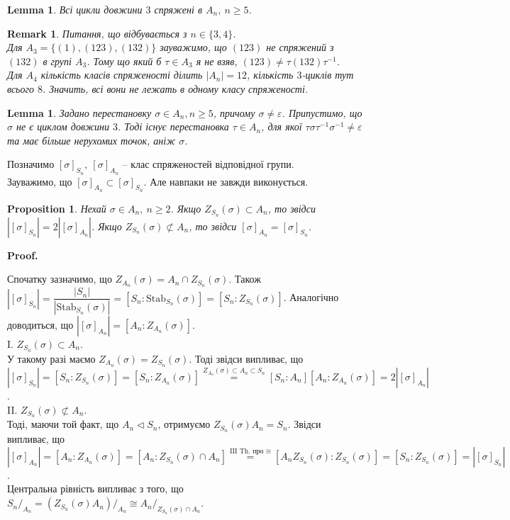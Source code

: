 \documentclass[a4paper, 10pt]{article}
\makeatletter
\theoremstyle{theoremdd}
\theoremstyle{theoremdd}
\theoremstyle{theoremdd}
\theoremstyle{theoremdd}
\theoremstyle{theoremdd}
\theoremstyle{theoremdd}
\theoremstyle{theoremdd}
\theoremstyle{theoremdd}
\theoremstyle{theoremdd}
\newtheorem{proposition}[theorem]{Proposition}
\theoremstyle{theoremdd}
\theoremstyle{theoremdd}
\newtheorem{remark}[theorem]{Remark}
\theoremstyle{theoremdd}
\theoremstyle{theoremdd}
\newtheorem{lemma}[theorem]{Lemma}
\theoremstyle{theoremdd}
\theoremstyle{theoremdd}
\renewenvironment{proof}[1][Proof.\\]{\par
\pushQED{\hfill \qed}%
\normalfont \topsep6\p@\@plus6\p@\relax
\trivlist
\item\relax
{\bfseries
#1\@addpunct{.}}\hspace\labelsep\ignorespaces
}{%
\popQED\endtrivlist\@endpefalse
}
\newcommand\Stab{\text{Stab}}
\makeatother
\begin{document}
\begin{lemma}
Всі цикли довжини $3$ спряжені в $A_n,\ n \geq 5$.
\end{lemma}

\begin{remark}
Питання, що відбувається з $n \in \{3,4\}$.\\
Для $A_3 = \{ (1), (123), (132) \}$ зауважимо, що $(123)$ не спряжений з $(132)$ в групі $A_3$. Тому що який б $\tau \in A_3$ я не взяв, $(123) \neq \tau (132) \tau^{-1}$.\\
Для $A_4$ кількість класів спряженості ділить $|A_n| = 12$, кількість $3$-циклів тут всього $8$. Значить, всі вони не лежать в одному класу спряженості.
\end{remark}

\begin{lemma}
Задано перестановку $\sigma \in A_n, n \geq 5$, причому $\sigma \neq \varepsilon$. Припустимо, що $\sigma$ не є циклом довжини $3$. Тоді існує перестановка $\tau \in A_n$, для якої $\tau \sigma \tau^{-1} \sigma^{-1} \neq \varepsilon$ та має більше нерухомих точок, аніж $\sigma$.
\end{lemma}

Позначимо $[\sigma]_{S_n},\ [\sigma]_{A_n}$ -- клас спряженостей відповідної групи.\\
Зауважимо, що $[\sigma]_{A_n} \subset [\sigma]_{S_n}$. Але навпаки не завжди виконується. 

\begin{proposition}
Нехай $\sigma \in A_n,\ n \geq 2$. Якщо $Z_{S_n}(\sigma) \subset A_n$, то звідси $|[\sigma]_{S_n}| = 2|[\sigma]_{A_n}|$. Якщо $Z_{S_n}(\sigma) \not\subset A_n$, то звідси $[\sigma]_{A_n} = [\sigma]_{S_n}$.
\end{proposition}

\begin{proof}
Спочатку зазначимо, що $Z_{A_n}(\sigma) = A_n \cap Z_{S_n}(\sigma)$. Також $|[\sigma]_{S_n}| = \dfrac{|S_n|}{|\Stab_{S_n}(\sigma)|} = [S_n : \Stab_{S_n}(\sigma)] = [S_n : Z_{S_n}(\sigma)]$. Аналогічно доводиться, що $|[\sigma]_{A_n}| = [A_n : Z_{A_n}(\sigma)]$.
\bigskip \\
I. $Z_{S_n}(\sigma) \subset A_n$.\\
У такому разі маємо $Z_{A_n}(\sigma) = Z_{S_n}(\sigma)$. Тоді звідси випливає, що\\
$|[\sigma]_{S_n}| = [S_n : Z_{S_n}(\sigma)] = [S_n : Z_{A_n}(\sigma)] \overset{Z_{A_n}(\sigma) \subset A_n \subset S_n}{=} [S_n : A_n] [A_n : Z_{A_n}(\sigma)] = 2 |[\sigma]_{A_n}|$.
\bigskip \\
II. $Z_{S_n}(\sigma) \not\subset A_n$.\\
Тоді, маючи той факт, що $A_n \triangleleft S_n$, отримуємо $Z_{S_n}(\sigma) A_n = S_n$. Звідси випливає, що\\
$|[\sigma]_{A_n}| = [A_n : Z_{A_n}(\sigma)] = [A_n : Z_{S_n}(\sigma) \cap A_n] \overset{\text{III Th. про $\cong$}}{=} [A_n Z_{S_n}(\sigma) : Z_{S_n}(\sigma)] = [S_n : Z_{S_n}(\sigma)] = |[\sigma]_{S_n}|$.\\
Центральна рівність випливає з того, що $S_n/_{A_n} = (Z_{S_n}(\sigma) A_n)/_{A_n} \cong A_n/_{Z_{S_n}(\sigma) \cap A_n}$.
\end{proof}
\end{document}
